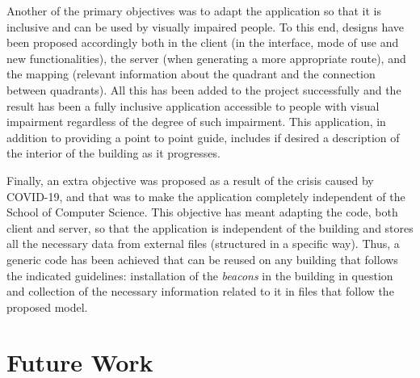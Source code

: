 Another of the primary objectives was to adapt the application so that it is inclusive and can be used by visually impaired people. To this end, designs have been proposed accordingly both in the client (in the interface, mode of use and new functionalities), the server (when generating a more appropriate route), and the mapping (relevant information about the quadrant and the connection between quadrants). All this has been added to the project successfully and the result has been a fully inclusive application accessible to people with visual impairment regardless of the degree of such impairment. This application, in addition to providing a point to point guide, includes if desired a description of the interior of the building as it progresses.

Finally, an extra objective was proposed as a result of the crisis caused by COVID-19, and that was to make the application completely independent of the School of Computer Science. This objective has meant adapting the code, both client and server, so that the application is independent of the building and stores all the necessary data from external files (structured in a specific way). Thus, a generic code has been achieved that can be reused on any building that follows the indicated guidelines: installation of the \textit{beacons} in the building in question and collection of the necessary information related to it in files that follow the proposed model.

\section {Future Work}
\label{sec:trabajoFuturo_eng}

